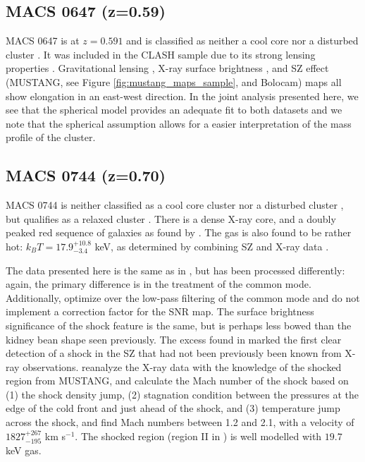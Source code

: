 \documentclass[iop,numberedappendix,apj]{emulateapj}
\begin{document}
\subsection{MACS 0647 (z=0.59)}
\label{sec:results_m0647}


MACS 0647 is at $z = 0.591$ and is classified as neither a cool core nor a disturbed cluster \citep{sayers2013}. 
It was included in the CLASH sample due to its strong lensing properties \citep{postman2012}.
Gravitational lensing \citep{zitrin2011}, X-ray surface brightness \citep{mann2012}, 
and SZ effect (MUSTANG, see Figure \ref{fig:mustang_maps_sample}, and Bolocam) maps all
show elongation in an east-west direction. 
In the joint analysis presented here, we see that the spherical model provides an adequate fit to both datasets and we note 
that the spherical assumption allows for a easier interpretation of the mass profile of the cluster.


\subsection{MACS 0744 (z=0.70)}
\label{sec:results_m0744}


MACS 0744 is neither classified as a cool core cluster nor a disturbed cluster \citep{mann2012,sayers2013}, but qualifies
as a relaxed cluster \citep{mann2012}. There is a dense X-ray core, and a doubly peaked red sequence of galaxies as found
by \citet{kartaltepe2008}. The gas is also found to be rather hot: $k_B T = 17.9_{-3.4}^{+10.8}$ keV, as determined by combining
SZ and X-ray data \citep{laroque2003}. 

The data presented here is the same as in \citet{korngut2011}, but has been processed differently: again, the primary difference
is in the treatment of the common mode. Additionally, \citet{korngut2011} optimize over the low-pass filtering of the common mode
and do not implement a correction factor for the SNR map. The surface brightness significance of the shock feature is the same, 
but is perhaps less
bowed than the kidney bean shape seen previously.  The excess found in \citet{korngut2011}
marked the first clear detection of a shock in the SZ that had not been previously been known from X-ray observations. 
\citet{korngut2011}
reanalyze the X-ray data with the knowledge of the shocked region from MUSTANG, and calculate the Mach number of the shock
based on (1) the shock density jump, (2) stagnation condition between the pressures at the edge of the cold front and just
ahead of the shock, and (3) temperature jump across the shock, and find Mach numbers between 1.2 and 2.1, with a velocity of 
$1827_{-195}^{+267}$ km s$^{-1}$. The shocked region (region II in \citet{korngut2011}) is well modelled with $19.7$ keV gas.
\end{document}
